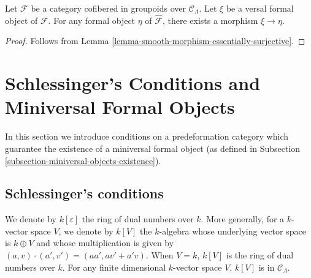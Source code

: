 \begin{lemma}
\label{lemma-versal-object-quasi-initial}
Let $\mathcal{F}$ be a category cofibered in groupoids over $\mathcal 
C_\Lambda$.  Let $\xi$ be a versal formal object of $\mathcal{F}$.  For any 
formal object $\eta$ of $\widehat{\mathcal{F}}$, there exists a morphism $\xi 
\to \eta$.
\end{lemma}

\begin{proof}
Follows from Lemma \ref{lemma-smooth-morphism-essentially-surjective}.
\end{proof}




\section{Schlessinger's Conditions and Miniversal Formal Objects}
\label{section-miniversal-objects}

\noindent
In this section we introduce conditions on a predeformation category which 
guarantee the existence of a miniversal formal object (as defined in
Subsection \ref{subsection-miniversal-objects-existence}).




\subsection{Schlessinger's conditions}
\label{section-schlessinger-conditions}

\noindent
We denote by $k[\varepsilon]$ the ring of dual numbers over $k$.  More 
generally, for a $k$-vector space $V$, we denote by $k[V]$ the $k$-algebra 
whose underlying vector space is $k \oplus V$ and whose multiplication is given 
by $(a,v) \cdot (a',v') = (aa', av' + a'v)$.  When $V = k$, $k[V]$ is the ring 
of dual numbers over $k$.  For any finite dimensional $k$-vector space $V$, 
$k[V]$ is in $\mathcal{C}_\Lambda$.

